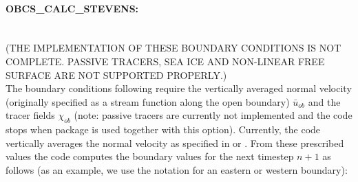 \paragraph{OBCS\_CALC\_STEVENS:} ~ \\
(THE IMPLEMENTATION OF THESE BOUNDARY CONDITIONS IS NOT
COMPLETE. PASSIVE TRACERS, SEA ICE AND NON-LINEAR FREE SURFACE ARE NOT
SUPPORTED PROPERLY.) \\ 
The boundary conditions following \citet{stevens:90} require the
vertically averaged normal velocity (originally specified as a stream
function along the open boundary) $\bar{u}_{ob}$ and the tracer fields
$\chi_{ob}$ (note: passive tracers are currently not implemented and
the code stops when package  is used together with this
option). Currently, the code vertically averages the normal velocity
as specified in  or . From these
prescribed values the code computes the boundary values for the next
timestep $n+1$ as follows (as an example, we use the notation for an
eastern or western boundary):
